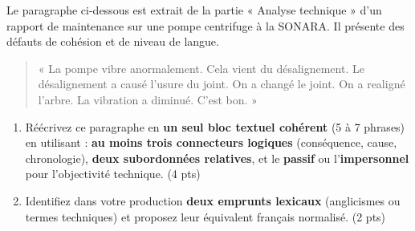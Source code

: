 \documentclass[11pt]{article}
\begin{document}
\begin{exercice}
Le paragraphe ci-dessous est extrait de la partie « Analyse technique » d'un rapport de maintenance sur une pompe centrifuge à la SONARA. Il présente des défauts de cohésion et de niveau de langue.

\begin{quote}
« La pompe vibre anormalement. Cela vient du désalignement. Le désalignement a causé l'usure du joint. On a changé le joint. On a realigné l'arbre. La vibration a diminué. C'est bon. »
\end{quote}

\begin{enumerate}
\item Réécrivez ce paragraphe en \textbf{un seul bloc textuel cohérent} (5 à 7 phrases) en utilisant : \textbf{au moins trois connecteurs logiques} (conséquence, cause, chronologie), \textbf{deux subordonnées relatives}, et le \textbf{passif} ou l'\textbf{impersonnel} pour l'objectivité technique. \hfill (4 pts)
\item Identifiez dans votre production \textbf{deux emprunts lexicaux} (anglicismes ou termes techniques) et proposez leur équivalent français normalisé. \hfill (2 pts)
\end{enumerate}
\end{exercice}
\end{document}
